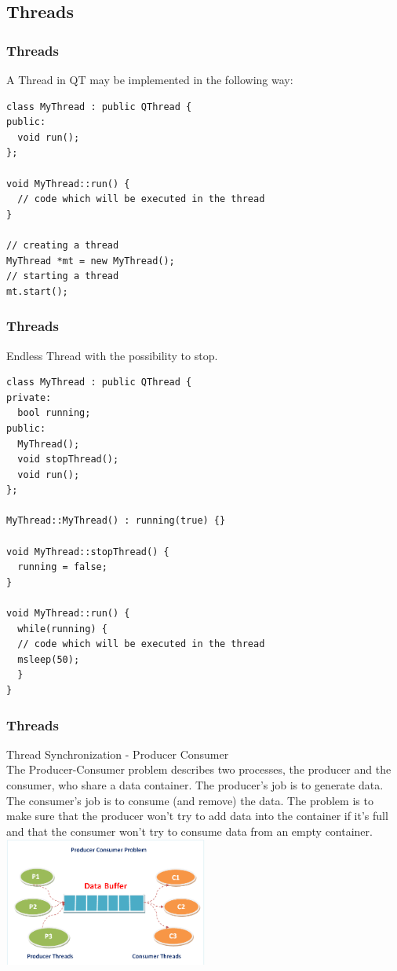 \subsection{Threads}
\begin{frame}[fragile]
\frametitle{Threads}
A Thread in QT may be implemented in the following way:
{\tiny
\begin{lstlisting}
class MyThread : public QThread {
public:
  void run();
};

void MyThread::run() {
  // code which will be executed in the thread
}

// creating a thread
MyThread *mt = new MyThread();
// starting a thread
mt.start();
\end{lstlisting}
}
\end{frame}

\begin{frame}[fragile]
\frametitle{Threads}
Endless Thread with the possibility to stop.
{\tiny
\begin{lstlisting}
class MyThread : public QThread {
private:
  bool running;
public:
  MyThread();
  void stopThread();
  void run();
};

MyThread::MyThread() : running(true) {}

void MyThread::stopThread() {
  running = false;
}

void MyThread::run() {
  while(running) {
  // code which will be executed in the thread
  msleep(50);
  }
}
\end{lstlisting}
}
\end{frame}

\begin{frame}[fragile]
\frametitle{Threads}
Thread Synchronization - Producer Consumer\\
{\tiny
The Producer-Consumer problem describes two processes, the producer and the consumer, who share a data container. The producer's job is to generate data. The consumer's job is to consume (and remove) the data. The problem is to make sure that the producer won't try to add data into the container if it's full and that the consumer won't try to consume data from an empty container.
}
\includegraphics[width=190pt]{img/prodcon.png}

\end{frame}

